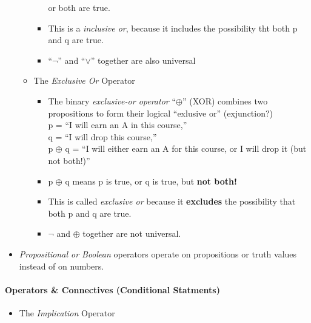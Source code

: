 \documentclass[english, 11pt]{article}
\begin{document}
\begin{addmargin}[2em]{2em}
\begin{addmargin}[1em]{2em}
\begin{itemize}
\begin{itemize}
\begin{itemize}
                        or both are true.
                        \item This is a \textit{inclusive or}, because it includes
                        the possibility tht both p and q are true.
                        \item ``$\neg$'' and ``$\vee$'' together are also universal
                      \end{itemize}
                  \item The \textit{Exclusive Or} Operator
                    \begin{itemize}
                      \item The binary \textit{exclusive-or operator} ``$\oplus$'' (XOR)
                      combines two propositions to form their logical ``exlusive or'' (exjunction?)
                      \\
                      p = ``I will earn an A in this course,''
                      \\
                      q = ``I will drop this course,''
                      \\
                      p $\oplus$ q = ``I will either earn an A for this course,
                      or I will drop it (but not both!)''

                      \item p $\oplus$ q means p is true, or q is true, but \textbf{not both!}
                      \item This is called \textit{exclusive or} because it
                      \textbf{excludes} the possibility that both p and q are true.
                      \item $\neg$ and $\oplus$ together are not universal.

                \end{itemize}
              \end{itemize}
            \item \textit{Propositional or Boolean} operators operate on
            propositions or truth values instead of on numbers.
          \end{itemize}
    \end{addmargin}

  \paragraph{Operators \& Connectives (Conditional Statments)}
    \begin{itemize}
      \item The \textit{Implication} Operator



\end{itemize}
\end{addmargin}
\end{document}
